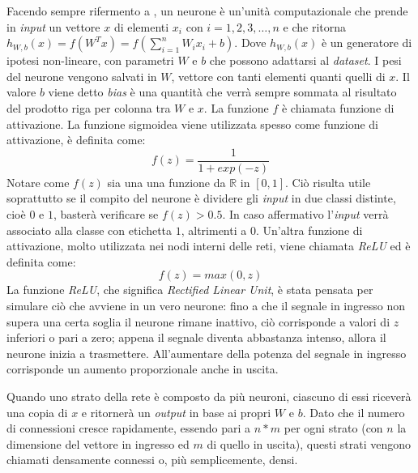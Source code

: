 Facendo sempre rifermento a \cite{ng_sparse_ae}, un neurone è un'unità computazionale che prende in \textit{input} un vettore $x$ di elementi $x_i$ con $i=1,2,3,\dots,n$ e che ritorna $h_{W,b}(x) = f(W^Tx) = f(\sum_{i=1}^{n} W_i x_i + b)$.
Dove $h_{W,b}(x)$ è un generatore di ipotesi non-lineare, con parametri $W$ e $b$ che possono adattarsi al \textit{dataset}.
I pesi del neurone vengono salvati in $W$, vettore con tanti elementi quanti quelli di $x$.
Il valore $b$ viene detto \textit{bias} è una quantità che verrà sempre sommata al risultato del prodotto riga per colonna tra $W$ e $x$.
La funzione $f$ è chiamata funzione di attivazione.
La funzione sigmoidea viene utilizzata spesso come funzione di attivazione, è definita come:
\begin{equation*}
  f(z) = \frac{1}{1 + exp(-z)}
\end{equation*} %
Notare come $f(z)$ sia una una funzione da $\mathbb{R}$ in $[0,1]$.
Ciò risulta utile soprattutto se il compito del neurone è dividere gli \textit{input} in due classi distinte, cioè $0$ e $1$, basterà verificare se $f(z)>0.5$.
In caso affermativo l'\textit{input} verrà associato alla classe con etichetta $1$, altrimenti a $0$.
Un'altra funzione di attivazione, molto utilizzata nei nodi interni delle reti, viene chiamata \textit{ReLU} ed è definita come:
\begin{equation*}
  f(z) = max(0,z)
\end{equation*} %
La funzione \textit{ReLU}, che significa \textit{Rectified Linear Unit}, è stata pensata per simulare ciò che avviene in un vero neurone:
fino a che il segnale in ingresso non supera una certa soglia il neurone rimane inattivo, ciò corrisponde a valori di $z$ inferiori o pari a zero;
appena il segnale diventa abbastanza intenso, allora il neurone inizia a trasmettere.
All'aumentare della potenza del segnale in ingresso corrisponde un aumento proporzionale anche in uscita.

Quando uno strato della rete è composto da più neuroni, ciascuno di essi riceverà una copia di $x$ e ritornerà un \textit{output} in base ai propri $W$ e $b$.
Dato che il numero di connessioni cresce rapidamente, essendo pari a $n*m$ per ogni strato (con $n$ la dimensione del vettore in ingresso ed $m$ di quello in uscita), questi strati vengono chiamati densamente connessi o, più semplicemente, densi.

